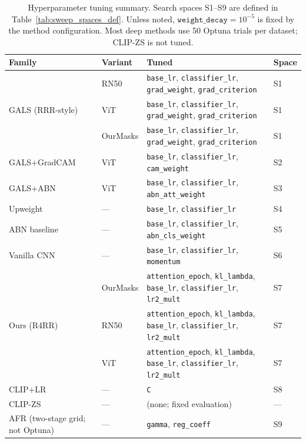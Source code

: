 \documentclass[10pt,twocolumn,letterpaper]{article}
\begin{document}
\FloatBarrier
\begin{table}[!ht]
\centering
\caption{Hyperparameter tuning summary. Search spaces S1--S9 are defined in Table~\ref{tab:sweep_spaces_def}. Unless noted, $\texttt{weight\_decay}=10^{-5}$ is fixed by the method configuration. Most deep methods use 50 Optuna trials \cite{akiba2019optuna} per dataset; CLIP-ZS is not tuned.}
\label{tab:sweep_spaces_summary}
\scriptsize
\setlength{\tabcolsep}{3pt}
\renewcommand{\arraystretch}{1.15}
\begin{tabularx}{\linewidth}{l l X l}
\toprule
\textbf{Family} & \textbf{Variant} & \textbf{Tuned} & \textbf{Space} \\
\midrule
\multirow{3}{*}{GALS (RRR-style)}
& RN50     & \texttt{base\_lr}, \texttt{classifier\_lr}, \texttt{grad\_weight}, \texttt{grad\_criterion} & S1 \\
& ViT      & \texttt{base\_lr}, \texttt{classifier\_lr}, \texttt{grad\_weight}, \texttt{grad\_criterion} & S1 \\
& OurMasks & \texttt{base\_lr}, \texttt{classifier\_lr}, \texttt{grad\_weight}, \texttt{grad\_criterion} & S1 \\
\midrule
GALS+GradCAM & ViT & \texttt{base\_lr}, \texttt{classifier\_lr}, \texttt{cam\_weight} & S2 \\
GALS+ABN     & ViT & \texttt{base\_lr}, \texttt{classifier\_lr}, \texttt{abn\_att\_weight} & S3 \\
Upweight     & --- & \texttt{base\_lr}, \texttt{classifier\_lr} & S4 \\
ABN baseline & --- & \texttt{base\_lr}, \texttt{classifier\_lr}, \texttt{abn\_cls\_weight} & S5 \\
Vanilla CNN  & --- & \texttt{base\_lr}, \texttt{classifier\_lr}, \texttt{momentum} & S6 \\
\midrule
\multirow{3}{*}{Ours (R4RR)}
& OurMasks & \texttt{attention\_epoch}, \texttt{kl\_lambda}, \texttt{base\_lr}, \texttt{classifier\_lr}, \texttt{lr2\_mult} & S7 \\
& RN50     & \texttt{attention\_epoch}, \texttt{kl\_lambda}, \texttt{base\_lr}, \texttt{classifier\_lr}, \texttt{lr2\_mult} & S7 \\
& ViT      & \texttt{attention\_epoch}, \texttt{kl\_lambda}, \texttt{base\_lr}, \texttt{classifier\_lr}, \texttt{lr2\_mult} & S7 \\
\midrule
CLIP+LR & --- & \texttt{C} & S8 \\
CLIP-ZS & --- & (none; fixed evaluation) & --- \\
\midrule
AFR (two-stage grid; not Optuna) & --- & \texttt{gamma}, \texttt{reg\_coeff} & S9 \\
\bottomrule
\end{tabularx}
\end{table}
\FloatBarrier
\end{document}
